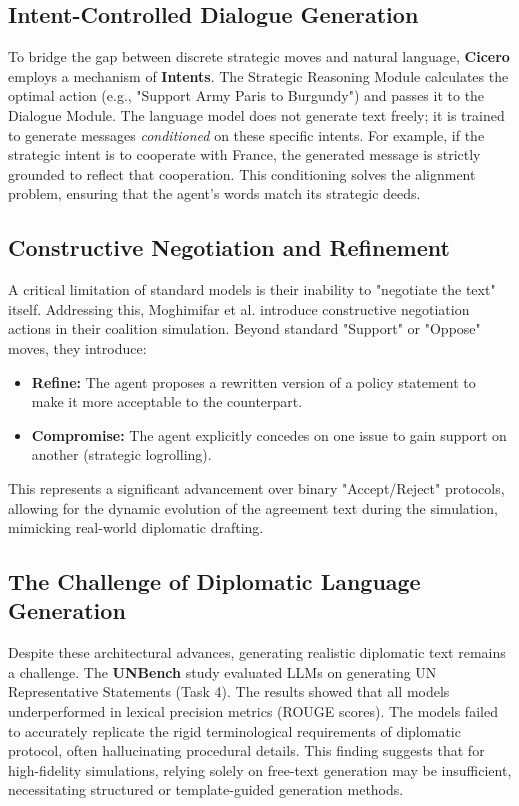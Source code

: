 \subsection{Intent-Controlled Dialogue Generation}
To bridge the gap between discrete strategic moves and natural language, \textbf{Cicero} employs a mechanism of \textbf{Intents}. The Strategic Reasoning Module calculates the optimal action (e.g., "Support Army Paris to Burgundy") and passes it to the Dialogue Module.
The language model does not generate text freely; it is trained to generate messages \textit{conditioned} on these specific intents. For example, if the strategic intent is to cooperate with France, the generated message is strictly grounded to reflect that cooperation. This conditioning solves the alignment problem, ensuring that the agent's words match its strategic deeds.

\subsection{Constructive Negotiation and Refinement}
A critical limitation of standard models is their inability to "negotiate the text" itself. Addressing this, Moghimifar et al. \cite{moghimifar2024modelling} introduce constructive negotiation actions in their coalition simulation. Beyond standard "Support" or "Oppose" moves, they introduce:
\begin{itemize}
    \item \textbf{Refine:} The agent proposes a rewritten version of a policy statement to make it more acceptable to the counterpart.
    \item \textbf{Compromise:} The agent explicitly concedes on one issue to gain support on another (strategic logrolling).
\end{itemize}
This represents a significant advancement over binary "Accept/Reject" protocols, allowing for the dynamic evolution of the agreement text during the simulation, mimicking real-world diplomatic drafting.

\subsection{The Challenge of Diplomatic Language Generation}
Despite these architectural advances, generating realistic diplomatic text remains a challenge. The \textbf{UNBench} study \cite{liang2025benchmarking} evaluated LLMs on generating UN Representative Statements (Task 4). The results showed that all models underperformed in lexical precision metrics (ROUGE scores). The models failed to accurately replicate the rigid terminological requirements of diplomatic protocol, often hallucinating procedural details. This finding suggests that for high-fidelity simulations, relying solely on free-text generation may be insufficient, necessitating structured or template-guided generation methods.

